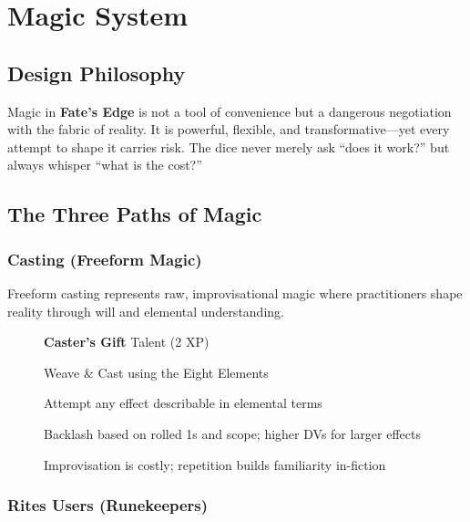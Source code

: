 \chapter{Magic System}
\label{chap:magic-system}

\section{Design Philosophy}
\label{sec:magic-philosophy}

Magic in \textbf{Fate's Edge} is not a tool of convenience but a dangerous negotiation with the fabric of reality. It is powerful, flexible, and transformative—yet every attempt to shape it carries risk. The dice never merely ask ``does it work?'' but always whisper ``what is the cost?'' 

\section{The Three Paths of Magic}
\label{sec:three-paths}

\subsection{Casting (Freeform Magic)}
\label{subsec:freeform-casting}

Freeform casting represents raw, improvisational magic where practitioners shape reality through will and elemental understanding.

\begin{description}
\item[]  \textbf{Caster's Gift} Talent (2 XP)
\item[] Weave \& Cast using the Eight Elements
\item[] Attempt any effect describable in elemental terms
\item[] Backlash based on rolled 1s and scope; higher DVs for larger effects 
\item[] Improvisation is costly; repetition builds familiarity in-fiction
\end{description}

\subsection{Rites Users (Runekeepers)}
\label{subsec:rites-users}

